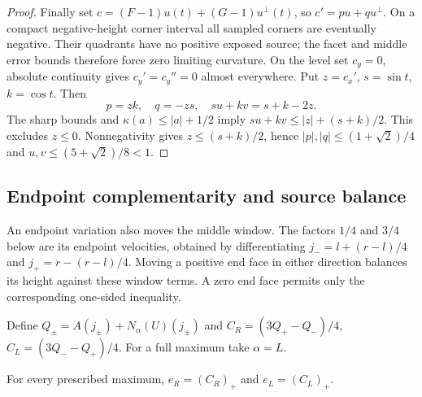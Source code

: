 \begin{proof}
Finally set $c=(F-1)u(t)+(G-1)u^\perp(t)$, so
$c'=pu+qu^\perp$. On a compact negative-height corner interval
all sampled corners are eventually negative. Their quadrants have
no positive exposed source; the facet and middle error bounds
therefore force zero limiting curvature.
On the level set $c_y=0$, absolute continuity gives
$c_y'=c_y''=0$ almost everywhere. Put $z=c_x'$, $s=\sin t$,
$k=\cos t$. Then
\[
 p=zk,\quad q=-zs,\quad su+kv=s+k-2z.
\]
The sharp bounds and $\kappa(a)\le|a|+1/2$ imply
$su+kv\le|z|+(s+k)/2$. This excludes $z\le0$.
Nonnegativity gives $z\le(s+k)/2$, hence
$|p|,|q|\le(1+\sqrt2)/4$ and
$u,v\le(5+\sqrt2)/8<1$.
\end{proof}

\subsection{Endpoint complementarity and source balance}

An endpoint variation also moves the middle window. The factors $1/4$
and $3/4$ below are its endpoint velocities, obtained by differentiating
$j_-=l+(r-l)/4$ and $j_+=r-(r-l)/4$. Moving a positive end face in
either direction balances its height against these window terms. A
zero end face permits only the corresponding one-sided inequality.

Define $Q_\pm=A(j_\pm)+N_\alpha(U)(j_\pm)$ and
$C_R=(3Q_+-Q_-)/4$, $C_L=(3Q_--Q_+)/4$.
For a full maximum take $\alpha=L$.

\begin{lemma}\label{lem:variation-complementarity}
For every prescribed maximum,
$e_R=(C_R)_+$ and $e_L=(C_L)_+$.
\end{lemma}

